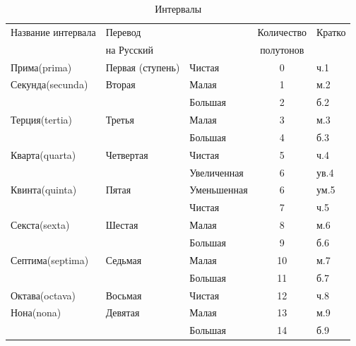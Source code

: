 \begin{table}[!ht]
    \caption{Интервалы}
    \label{t:harmony:interval:names}
    \centering
    \begin{tabular}{l|l|l|c|l}
        \hline\hline
        Название интервала & Перевод            &               & Количество  & Кратко  \\
                           & на Русский         &               & полутонов   &         \\
        \hline\hline
        Прима(prima)       & Первая (ступень)   & Чистая        & 0                 & ч.1 \\
        Секунда(secunda)   & Вторая             & Малая         & 1                 & м.2 \\
                           &                    & Большая       & 2                 & б.2 \\
        Терция(tertia)     & Третья             & Малая         & 3                 & м.3 \\
                           &                    & Большая       & 4                 & б.3 \\
        Кварта(quarta)     & Четвертая          & Чистая        & 5                 & ч.4 \\
                           &                    & Увеличенная   & 6                 & ув.4\\
        Квинта(quinta)     & Пятая              & Уменьшенная   & 6                 & ум.5\\
                           &                    & Чистая        & 7                 & ч.5 \\
        Секста(sexta)      & Шестая             & Малая         & 8                 & м.6 \\
                           &                    & Большая       & 9                 & б.6 \\
        Септима(septima)   & Седьмая            & Малая         & 10                & м.7 \\
                           &                    & Большая       & 11                & б.7 \\
        Октава(octava)     & Восьмая            & Чистая        & 12                & ч.8 \\
        \hline\hline
        Нона(nona)         & Девятая            & Малая         & 13                & м.9  \\
                           &                    & Большая       & 14                & б.9  \\

\end{tabular}
\end{table}
